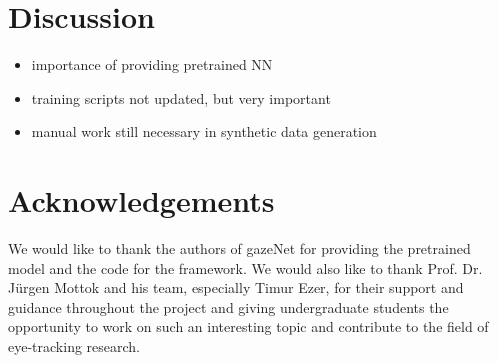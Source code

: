 \documentclass[acmlarge]{acmart}
\begin{document}
\section{Discussion}
\begin{itemize}
    \item importance of providing pretrained NN
    \item training scripts not updated, but very important
    \item manual work still necessary in synthetic data generation
\end{itemize}

\section{Acknowledgements}
We would like to thank the authors of gazeNet for providing the pretrained model and the code for the framework. We would also like to thank Prof. Dr. Jürgen Mottok and his team, especially Timur Ezer, for their support and guidance throughout the project and giving undergraduate students the opportunity to work on such an interesting topic and contribute to the field of eye-tracking research.



\end{document}
